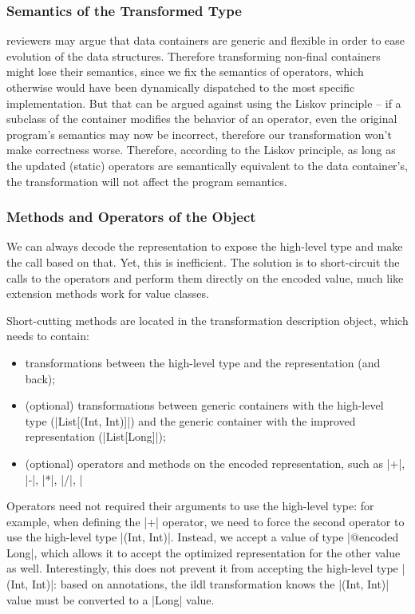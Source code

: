 
\subsubsection{Semantics of the Transformed Type}
reviewers may argue that data containers are generic and flexible in order to ease evolution of the data structures. Therefore transforming non-final containers might lose their semantics, since we fix the semantics of operators, which otherwise would have been dynamically dispatched to the most specific implementation. But that can be argued against using the Liskov principle -- if a subclass of the container modifies the behavior of an operator, even the original program's semantics may now be incorrect, therefore our transformation won't make correctness worse. Therefore, according to the Liskov principle, as long as the updated (static) operators are semantically equivalent to the data container's, the transformation will not affect the program semantics.

\subsubsection{Methods and Operators of the Object}
We can always decode the representation to expose the high-level type and make the call based on that. Yet, this is inefficient. The solution is to short-circuit the calls to the operators and perform them directly on the encoded value, much like extension methods work for value classes.

Short-cutting methods are located in the transformation description object, which needs to contain:
\begin{itemize}
  \item transformations between the high-level type and the representation (and back);
  \item (optional) transformations between generic containers with the high-level type (|List[(Int, Int)]|) and the generic container with the improved representation (|List[Long]|);
  \item (optional) operators and methods on the encoded representation, such as |+|, |-|, |*|, |/|, |%
\end{itemize}

Operators need not required their arguments to use the high-level type: for example, when defining the |+| operator, we need to force the second operator to use the high-level type |(Int, Int)|. Instead, we accept a value of type |@encoded Long|, which allows it to accept the optimized representation for the other value as well. Interestingly, this does not prevent it from accepting the high-level type |(Int, Int)|: based on annotations, the ildl transformation knows the |(Int, Int)| value must be converted to a |Long| value.

